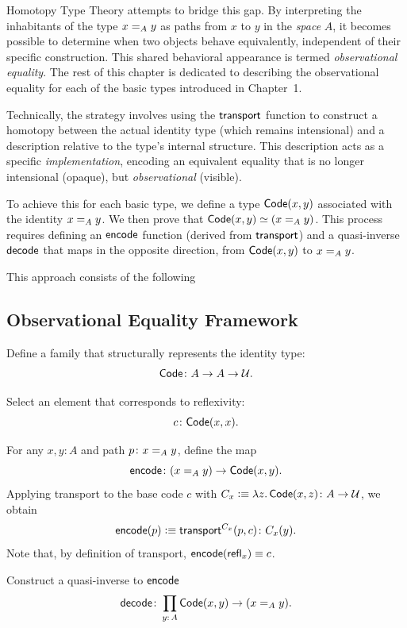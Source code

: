 Homotopy Type Theory attempts to bridge this gap. By interpreting the inhabitants of the type $x\mathrel{=_{A}}y$ as paths from $x$ to $y$ in the \textit{space} $A$, it becomes possible to determine when two objects behave equivalently, independent of their specific construction. This shared behavioral appearance is termed \textit{observational equality}. The rest of this chapter is dedicated to describing the observational equality for each of the basic types introduced in Chapter~1.

Technically, the strategy involves using the $\mathsf{transport}$ function to construct a homotopy between the actual identity type (which remains intensional) and a description relative to the type's internal structure. This description acts as a specific \emph{implementation}, encoding an equivalent equality that is no longer intensional (opaque), but \textit{observational} (visible).

To achieve this for each basic type, we define a type $\mathsf{Code}(x,y)$ associated with the identity $x\mathrel{=_{A}}y$. We then prove that $\mathsf{Code}(x,y)\simeq(x\mathrel{=_{A}}y)$. This process requires defining an $\mathsf{encode}$ function (derived from $\mathsf{transport}$) and a quasi-inverse $\mathsf{decode}$ that maps in the opposite direction, from $\mathsf{Code}(x,y)$ to $x\mathrel{=_{A}}y$.

This approach consists of the following

\subsection{Observational Equality Framework}\label{observational-framework}
\begin{description}
    [font=\normalfont\scshape]
    \item[Code family.]
    Define a family that structurally represents the identity type:
    \[
        \fun{Code} \colon A \to A \to \univ.
    \]

    \item[Base code.]
    Select an element that corresponds to reflexivity:
    \[
        c \colon\fun{Code}(x,x).
    \]

    \item[Encode function.]
    For any $x,y\colon A$ and path $p\colon x\eq{A}y$, define the map
    \[
        \fun{encode}\colon (x\eq{A}y) \to \fun{Code}(x,y).
    \]
    Applying transport to the base code $c$ with $C_x\defeq\lambda z.\,\fun{Code}(x,z)\colon A\to\univ$, we obtain
    \[
        \fun{encode}(p) \defeq \fun{transport}^{C_x}(p, c) \colon C_x(y).
    \]
    Note that, by definition of transport, $\mathsf{encode}(\mathsf{refl}_x) \equiv c$.

    \item[Decode function.]
    Construct a quasi-inverse to $\mathsf{encode}$
    \[
        \fun{decode} \colon \prod_{y\colon A} \fun{Code}(x,y) \to (x\eq{A}y).
    \]
\end{description}

